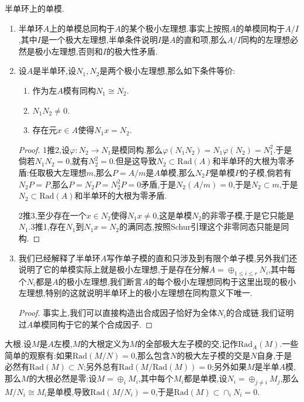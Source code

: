 半单环上的单模.
\begin{enumerate}
	\item 半单环$A$上的单模总同构于$A$的某个极小左理想.事实上按照$A$的单模同构于$A/I$,其中$I$是一个极大左理想,半单条件说明$I$是$A$的直和项,那么$A/I$同构的左理想必然是极小左理想,否则和$I$的极大性矛盾.
	\item 设$A$是半单环,设$N_1,N_2$是两个极小左理想,那么如下条件等价:
	\begin{enumerate}
		\item 作为左$A$模有同构$N_1\cong N_2$.
		\item $N_1N_2\not=0$.
		\item 存在元$x\in A$使得$N_1x=N_2$.
	\end{enumerate}
	\begin{proof}
		
		1推2,设$\varphi:N_2\to N_1$是模同构.那么$\varphi(N_1N_2)=N_1\varphi(N_2)=N_1^2$.于是倘若$N_1N_2=0$,就有$N_2^2=0$.但是这导致$N_2\subset\mathrm{Rad}(A)$和半单环的大根为零矛盾:任取极大左理想$m$,那么$P=A/m$是$A$单模,那么$N_2P$是单模$P$的子模,倘若有$N_2P=P$,那么$P=N_2P=N_2^2P=0$矛盾,于是$N_2(A/m)=0$,于是$N_2\subset m$,于是$N_2\subset\mathrm{Rad}(A)$和半单环的大根为零矛盾.
		
		2推3,至少存在一个$x\in N_2$使得$N_1x\not=0$,这是单模$N_2$的非零子模,于是它只能是$N_1$.3推1,存在$N_1$到$N_1x=N_2$的满同态,按照Schur引理这个非零同态只能是同构.
	\end{proof}
	\item 我们已经解释了半单环$A$写作单子模的直和只涉及到有限个单子模,另外我们还说明了它的单模实际上就是极小左理想,于是存在分解$A=\oplus_{1\le i\le r}N_i$,其中每个$N_i$都是$A$的极小左理想,我们断言$A$的每个极小左理想同构于这里出现的极小左理想,特别的这就说明半单环上的极小左理想在同构意义下唯一.
	\begin{proof}
		
		事实上,我们可以直接构造出合成因子恰好为全体$N_i$的合成链.我们证明过$A$单模同构于它的某个合成因子.
	\end{proof}
\end{enumerate}

大根.设$M$是$A$左模,$M$的大根定义为$M$的全部极大左子模的交,记作$\mathrm{Rad}_A(M)$.一些简单的观察有:如果$\mathrm{Rad}(M/N)=0$,那么包含$N$的极大左子模的交是$N$自身,于是必然有$\mathrm{Rad}(M)\subset N$;另外总有$\mathrm{Rad}(M/\mathrm{Rad}(M))=0$;另外如果$M$是半单$A$模,那么$M$的大根必然是零:设$M=\oplus_iM_i$,其中每个$M_i$都是单模,设$N_i=\oplus_{j\not=i}M_j$,那么$M/N_i\cong M_i$是单模,导致$\mathrm{Rad}(M/N_i)=0$,于是$\mathrm{Rad}(M)\subset\cap_iN_i=0$.

